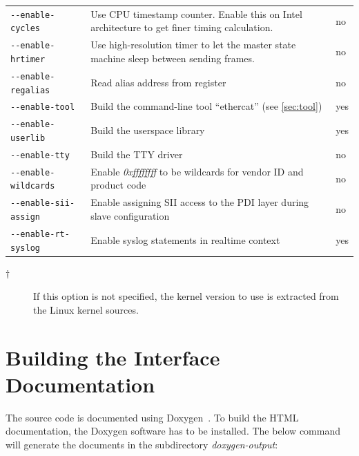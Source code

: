 \documentclass[a4paper,12pt,BCOR6mm,bibtotoc,idxtotoc]{scrbook}
\begin{document}
\begin{longtable}{l|p{}|l}
\lstinline+--enable-cycles+ & Use CPU timestamp counter. Enable this on Intel
architecture to get finer timing calculation. & no\\

\lstinline+--enable-hrtimer+ & Use high-resolution timer to let the master
state machine sleep between sending frames. & no\\

\lstinline+--enable-regalias+ & Read alias address from register & no\\

\lstinline+--enable-tool+ & Build the command-line tool ``ethercat'' (see
\autoref{sec:tool}) & yes\\

\lstinline+--enable-userlib+ & Build the userspace library & yes\\

\lstinline+--enable-tty+ & Build the TTY driver & no\\

\lstinline+--enable-wildcards+ & Enable \textit{0xffffffff} to be wildcards
for vendor ID and product code & no\\

\lstinline+--enable-sii-assign+ & Enable assigning SII access to the PDI layer
during slave configuration & no\\

\lstinline+--enable-rt-syslog+ & Enable syslog statements in realtime context &
yes\\

\hline

\end{longtable}

\begin{description}

\item[$\dagger$] If this option is not specified, the kernel version to use is
extracted from the Linux kernel sources.

\end{description}

\section{Building the Interface Documentation}
\label{sec:gendoc}

The source code is documented using Doxygen~\cite{doxygen}. To build the HTML
documentation, the Doxygen software has to be installed. The below command
will generate the documents in the subdirectory \textit{doxygen-output}:
\end{document}
